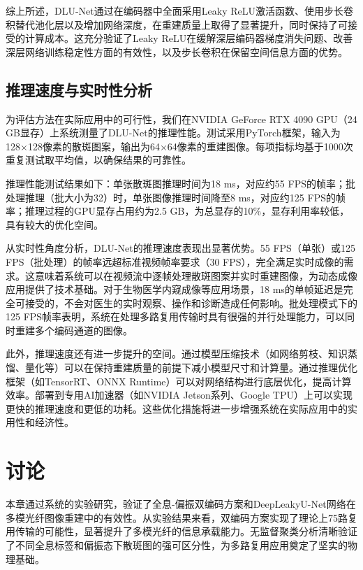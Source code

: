 {综上所述，DLU-Net通过在编码器中全面采用Leaky ReLU激活函数、使用步长卷积替代池化层以及增加网络深度，在重建质量上取得了显著提升，同时保持了可接受的计算成本。这充分验证了Leaky ReLU在缓解深层编码器梯度消失问题、改善深层网络训练稳定性方面的有效性，以及步长卷积在保留空间信息方面的优势。

\subsection{推理速度与实时性分析}\label{sec:inference_speed}

为评估方法在实际应用中的可行性，我们在NVIDIA GeForce RTX 4090 GPU（24 GB显存）上系统测量了DLU-Net的推理性能。测试采用PyTorch框架，输入为128×128像素的散斑图案，输出为64×64像素的重建图像。每项指标均基于1000次重复测试取平均值，以确保结果的可靠性。

推理性能测试结果如下：单张散斑图推理时间为18 ms，对应约55 FPS的帧率；批处理推理（批大小为32）时，单张图像推理时间降至8 ms，对应约125 FPS的帧率；推理过程的GPU显存占用约为2.5 GB，为总显存的10\%，显存利用率较低，具有较大的优化空间。

从实时性角度分析，DLU-Net的推理速度表现出显著优势。55 FPS（单张）或125 FPS（批处理）的帧率远超标准视频帧率要求（30 FPS），完全满足实时成像的需求。这意味着系统可以在视频流中逐帧处理散斑图案并实时重建图像，为动态成像应用提供了技术基础。对于生物医学内窥成像等应用场景，18 ms的单帧延迟是完全可接受的，不会对医生的实时观察、操作和诊断造成任何影响。批处理模式下的125 FPS帧率表明，系统在处理多路复用传输时具有很强的并行处理能力，可以同时重建多个编码通道的图像。

此外，推理速度还有进一步提升的空间。通过模型压缩技术（如网络剪枝、知识蒸馏、量化等）可以在保持重建质量的前提下减小模型尺寸和计算量。通过推理优化框架（如TensorRT、ONNX Runtime）可以对网络结构进行底层优化，提高计算效率。部署到专用AI加速器（如NVIDIA Jetson系列、Google TPU）上可以实现更快的推理速度和更低的功耗。这些优化措施将进一步增强系统在实际应用中的实用性和经济性。


\section{讨论}\label{sec:discussion_method}

本章通过系统的实验研究，验证了全息-偏振双编码方案和DeepLeakyU-Net网络在多模光纤图像重建中的有效性。从实验结果来看，双编码方案实现了理论上75路复用传输的可能性，显著提升了多模光纤的信息承载能力。无监督聚类分析清晰验证了不同全息标签和偏振态下散斑图的强可区分性，为多路复用应用奠定了坚实的物理基础。

}
